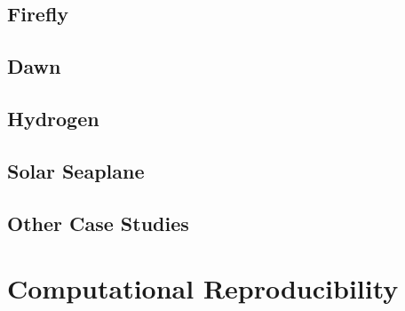 
\subsection{Firefly} %

\subsection{Dawn} %

\subsection{Hydrogen} %

\subsection{Solar Seaplane} %

\subsection{Other Case Studies} %


\section{Computational Reproducibility}
\label{sec:asb-reproducibility}
